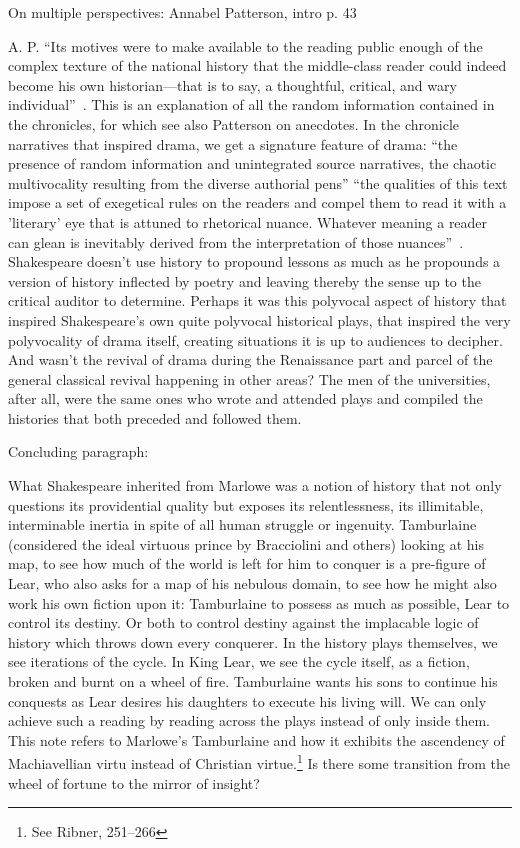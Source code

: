 On multiple perspectives: Annabel Patterson, intro p. 43

A. P. ``Its motives were to make available to the reading public enough of the complex texture of the national history that the middle-class reader could indeed become his own historian---that is to say, a thoughtful, critical, and wary individual''~\cite[8]{patterson_reading_1994}. This is an explanation of all the random information contained in the chronicles, for which see also Patterson on anecdotes. In the chronicle narratives that inspired drama, we get a signature feature of drama: ``the presence of random information and unintegrated source narratives, the chaotic multivocality resulting from the diverse authorial pens'' ``the qualities of this text impose a set of exegetical rules on the readers and compel them to read it with a 'literary' eye that is attuned to rhetorical nuance. Whatever meaning a reader can glean is inevitably derived from the interpretation of those nuances''~\cite[22]{djordjevic_holinsheds_2010}. Shakespeare doesn't use history to propound lessons as much as he propounds a version of history inflected by poetry and leaving thereby the sense up to the critical auditor to determine. Perhaps it was this polyvocal aspect of history that inspired Shakespeare's own quite polyvocal historical plays, that inspired the very polyvocality of drama itself, creating situations it is up to audiences to decipher. And wasn't the revival of drama during the Renaissance part and parcel of the general classical revival happening in other areas? The men of the universities, after all, were the same ones who wrote and attended plays and compiled the histories that both preceded and followed them.

Concluding paragraph:

What Shakespeare inherited from Marlowe was a notion of history that not only questions its providential quality but exposes its relentlessness, its illimitable, interminable inertia in spite of all human struggle or ingenuity. Tamburlaine (considered the ideal virtuous prince by Bracciolini and others) looking at his map, to see how much of the world is left for him to conquer is a pre-figure of Lear, who also asks for a map of his nebulous domain, to see how he might also work his own fiction upon it: Tamburlaine to possess as much as possible, Lear to control its destiny. Or both to control destiny against the implacable logic of history which throws down every conquerer. In the history plays themselves, we see iterations of the cycle. In King Lear, we see the cycle itself, as a fiction, broken and burnt on a wheel of fire. Tamburlaine wants his sons to continue his conquests as Lear desires his daughters to execute his living will. We can only achieve such a reading by reading across the plays instead of only inside them. This note refers to Marlowe's Tamburlaine and how it exhibits the ascendency of Machiavellian virtu instead of Christian virtue.\footnote{See Ribner, 251--266\nocite{ribner_idea_1953}} Is there some transition from the wheel of fortune to the mirror of insight?

